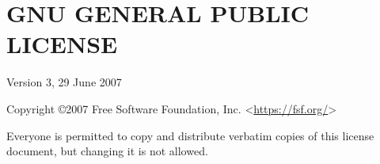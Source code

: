 \chapter{GNU GENERAL PUBLIC LICENSE}
\label{chap:gpl}
\begin{center} Version 3, 29 June 2007 \end{center}
Copyright \copyright 2007 Free Software Foundation, Inc. <\url{https://fsf.org/}>\par
Everyone is permitted to copy and distribute verbatim copies of this license document, but changing it is not allowed.\par
